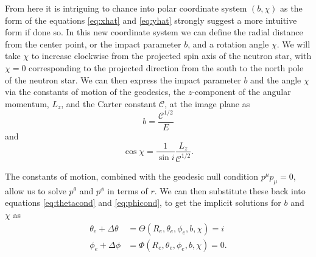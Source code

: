 \documentclass[iop, usenatbib]{emulateapj}
\newcommand{\be}{\begin{equation}}
\newcommand{\ee}{\end{equation}}
\newcommand{\Ca}{\ensuremath{\mathcal{C}}}
\begin{document}
From here it is intriguing to chance into polar coordinate system $(b, \chi)$ as the form of the equations \eqref{eq:xhat} and \eqref{eq:yhat} strongly suggest a more intuitive form if done so.
In this new coordinate system we can define the radial distance from the center point, or the impact parameter $b$, and a rotation angle $\chi$.
We will take $\chi$ to increase clockwise from the projected spin axis of the neutron star, with $\chi=0$ corresponding to the projected direction from the south to the north pole of the neutron star.
We can then express the impact parameter $b$ and the angle $\chi$ via the constants of motion of the geodesics, the $z$-component of the angular momentum, $L_z$, and the Carter constant $\Ca$, at the image plane as
\be
b = \frac{\Ca^{1/2}}{E}
\ee
and
\be
\cos \chi = \frac{1}{\sin i} \frac{L_z}{\Ca^{1/2}}.
\ee

The constants of motion, combined with the geodesic null condition $p^\mu p_\mu = 0$, allow us to solve $p^\theta$ and $p^\phi$ in terms of $r$.
We can then substitute these back into equations \eqref{eq:thetacond} and \eqref{eq:phicond}, to get the implicit solutions for $b$ and $\chi$ as
\begin{align}
\theta_e + \Delta\theta &= \Theta(R_e, \theta_e, \phi_e, b, \chi) = i\\
\phi_e + \Delta\phi     &= \Phi(R_e, \theta_e, \phi_e, b, \chi) = 0.
\end{align}
\end{document}
